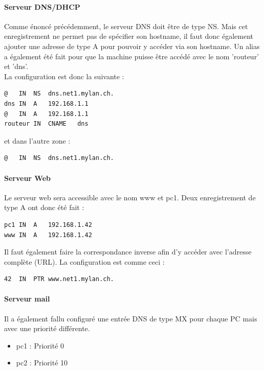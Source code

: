 \documentclass{article}
\begin{document}
\paragraph{Serveur DNS/DHCP}

Comme énoncé précédemment, le serveur DNS doit être de type NS. Mais cet enregistrement ne permet pas de spécifier son hostname, il faut donc également ajouter une adresse de type A pour pouvoir y accéder via son hostname. Un alias a également été fait pour que la machine puisse être accédé avec le nom 'routeur' et 'dns'.\\

La configuration est donc la suivante : 

\begin{lstlisting}
@	IN	NS	dns.net1.mylan.ch.
dns	IN	A	192.168.1.1
@	IN	A	192.168.1.1
routeur	IN	CNAME	dns
\end{lstlisting}

et dans l'autre zone :

\begin{lstlisting}
@	IN 	NS	dns.net1.mylan.ch.
\end{lstlisting}

\paragraph{Serveur Web}

Le serveur web sera accessible avec le nom www et pc1. Deux enregistrement de type A ont donc été fait : \\

\begin{lstlisting}
pc1	IN	A	192.168.1.42
www	IN	A	192.168.1.42
\end{lstlisting}

Il faut également faire la correspondance inverse afin d'y accéder avec l'adresse complète (URL). La configuration est comme ceci : 

\begin{lstlisting}
42	IN	PTR	www.net1.mylan.ch.
\end{lstlisting}

\paragraph{Serveur mail}

Il a également fallu configuré une entrée DNS de type MX pour chaque PC mais avec une priorité différente.

\begin{itemize}
	\item pc1 : Priorité 0
	\item pc2 : Priorité 10
\end{itemize}
\end{document}
